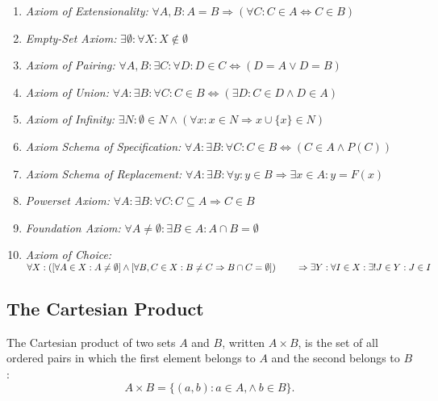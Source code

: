 \begin{enumerate}[label = \Roman*.]
	\item \emph{Axiom of Extensionality:} \quad \(\forall A, B: A = B \Rightarrow (\forall C: C \in A \Leftrightarrow C \in B)\)
	\item \emph{Empty-Set Axiom:} \quad \(\exists \emptyset : \forall X: X \notin \emptyset\)
	\item \emph{Axiom of Pairing:} \quad \(\forall A, B: \exists C: \forall D: D \in C \Leftrightarrow (D = A \lor D = B)\)
	\item \emph{Axiom of Union:} \quad \(\forall A: \exists B: \forall C: C \in B \Leftrightarrow (\exists D: C \in D \land D \in A)\)
	\item \emph{Axiom of Infinity:} \quad \(\exists N: \emptyset \in N \land (\forall x: x \in N \Rightarrow x \cup \{x\} \in N)\)
	\item \emph{Axiom Schema of Specification:} \quad \(\forall A: \exists B: \forall C: C \in B \Leftrightarrow (C \in A \land P(C))\)
	\item \emph{Axiom Schema of Replacement:} \quad \(\forall A: \exists B: \forall y: y \in B \Rightarrow \exists x \in A: y = F(x)\)
	\item \emph{Powerset Axiom:} \quad \(\forall A: \exists B: \forall C: C \subseteq A \Rightarrow C \in B\)
	\item \emph{Foundation Axiom:} \quad \(\forall A \ne \emptyset: \exists B \in A: A \cap B = \emptyset\)
	\item \emph{Axiom of Choice:} \quad \(\forall X:
		      \left( \left[ \forall A \in X: A \ne \emptyset \right] \land
		      \left[ \forall B, C \in X: B \ne C \Rightarrow B \cap C = \emptyset \right] \right) \\
		      \qquad \Rightarrow \exists Y: \forall I \in X: \exists! J \in Y: J \in I\)
\end{enumerate}

\subsection{The Cartesian Product}

The Cartesian product of two sets \(A\) and \(B\), written \(A \times B\), is the set of all ordered pairs in which the first element belongs to \(A\) and the second belongs to \(B\):
\[A \times B = \{ (a, b) : a \in A, \land\ b \in B\}.\]

